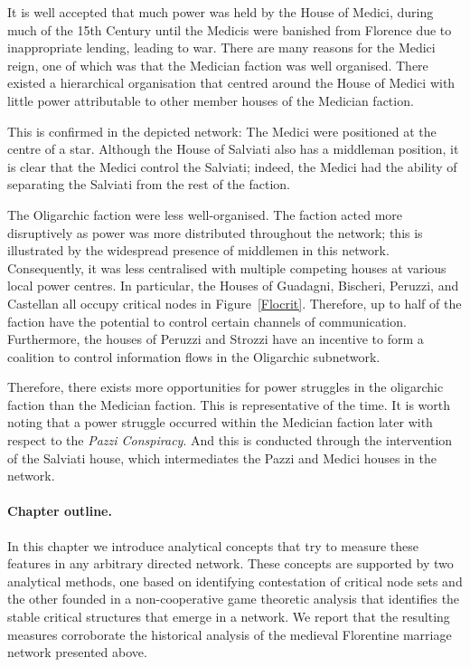 It is well accepted that much power was held by the House of Medici, during much of the 15th Century until the Medicis were banished from Florence due to inappropriate lending, leading to war. There are many reasons for the Medici reign, one of which was that the Medician faction was well organised. There existed a hierarchical organisation that centred around the House of Medici with little power attributable to other member houses of the Medician faction.

This is confirmed in the depicted network: The Medici were positioned at the centre of a star. Although the House of Salviati also has a middleman position, it is clear that the Medici control the Salviati; indeed, the Medici had the ability of separating the Salviati from the rest of the faction.

The Oligarchic faction were less well-organised. The faction acted more disruptively as power was more distributed throughout the network; this is illustrated by the widespread presence of middlemen in this network. Consequently, it was less centralised with multiple competing houses at various local power centres. In particular, the Houses of Guadagni, Bischeri, Peruzzi, and Castellan all occupy critical nodes in Figure~\ref{Flocrit}. Therefore, up to half of the faction have the potential to control certain channels of communication. Furthermore, the houses of Peruzzi and Strozzi have an incentive to form a coalition to control information flows in the Oligarchic subnetwork.

Therefore, there exists more opportunities for power struggles in the oligarchic faction than the Medician faction. This is representative of the time. It is worth noting that a power struggle occurred within the Medician faction later with respect to the \textit{Pazzi Conspiracy}. And this is conducted through the intervention of the Salviati house, which intermediates the Pazzi and Medici houses in the network.

\paragraph{Chapter outline.}

In this chapter we introduce analytical concepts that try to measure these features in any arbitrary directed network. These concepts are supported by two analytical methods, one based on identifying contestation of critical node sets and the other founded in a non-cooperative game theoretic analysis that identifies the stable critical structures that emerge in a network. We report that the resulting measures corroborate the historical analysis of the medieval Florentine marriage network presented above.

